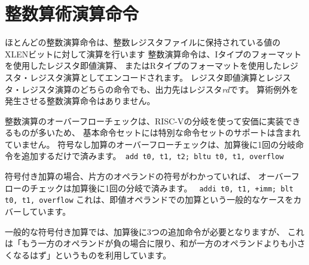 \section{整数算術演算命令}

ほとんどの整数演算命令は、整数レジスタファイルに保持されている値の
XLENビットに対して演算を行います
整数演算命令は、Iタイプのフォーマットを使用したレジスタ即値演算、
またはRタイプのフォーマットを使用したレジスタ・レジスタ演算としてエンコードされます。
レジスタ即値演算とレジスタ・レジスタ演算のどちらの命令でも、出力先はレジスタ{\em rd}です。
算術例外を発生させる整数演算命令はありません。

\begin{commentary}
\begin{comment}
We did not include special instruction-set support for overflow checks
on integer arithmetic operations in the base instruction set, as many
overflow checks can be cheaply implemented using RISC-V branches.
Overflow checking for unsigned addition requires only a single
additional branch instruction after the addition:
\verb! add t0, t1, t2; bltu t0, t1, overflow!.
\end{comment}

整数演算のオーバーフローチェックは、RISC-Vの分岐を使って安価に実装できるものが多いため、
基本命令セットには特別な命令セットのサポートは含まれていません。
符号なし加算のオーバーフローチェックは、加算後に1回の分岐命令を追加するだけで済みます。\verb! add t0, t1, t2; bltu t0, t1, overflow!

\begin{comment}
For signed addition, if one operand's sign is known, overflow checking
requires only a single branch after the addition:
\verb! addi t0, t1, +imm; blt t0, t1, overflow!.  This covers the
common case of addition with an immediate operand.
\end{comment}

符号付き加算の場合、片方のオペランドの符号がわかっていれば、
オーバーフローのチェックは加算後に1回の分岐で済みます。
\verb! addi t0, t1, +imm; blt t0, t1, overflow!
これは、即値オペランドでの加算という一般的なケースをカバーしています。

\begin{comment}
For general signed addition, three additional instructions after the
addition are required, leveraging the observation that the sum should
be less than one of the operands if and only if the other operand is
negative.
\end{comment}

一般的な符号付き加算では、加算後に3つの追加命令が必要となりますが、
これは「もう一方のオペランドが負の場合に限り、和が一方のオペランドよりも小さくなるはず」というものを利用しています。


\end{commentary}
